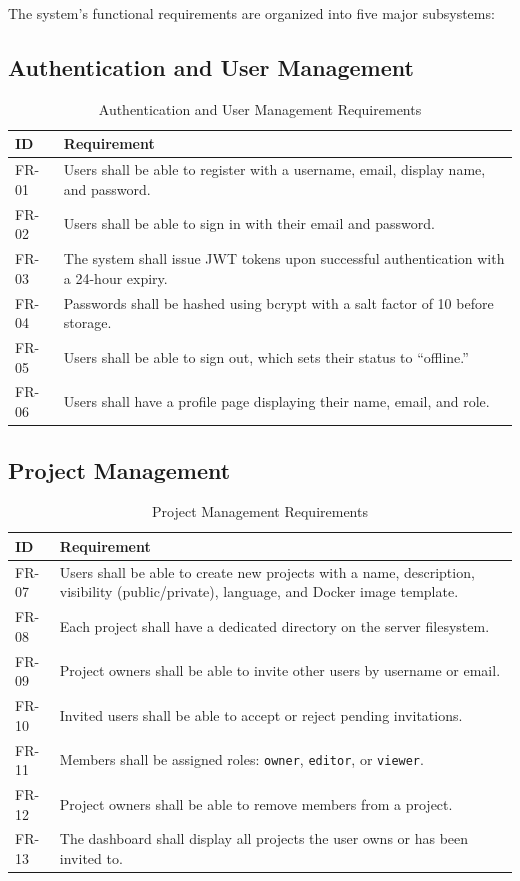 \documentclass[12pt,a4paper,oneside]{report}
\begin{document}
The system's functional requirements are organized into five major subsystems:

\subsection{Authentication and User Management}

\begin{table}[H]
\centering
\caption{Authentication and User Management Requirements}
\label{tab:auth-req}
\begin{tabularx}{\textwidth}{lX}
\toprule
\textbf{ID} & \textbf{Requirement} \\
\midrule
FR-01 & Users shall be able to register with a username, email, display name, and password. \\
FR-02 & Users shall be able to sign in with their email and password. \\
FR-03 & The system shall issue JWT tokens upon successful authentication with a 24-hour expiry. \\
FR-04 & Passwords shall be hashed using bcrypt with a salt factor of 10 before storage. \\
FR-05 & Users shall be able to sign out, which sets their status to ``offline.'' \\
FR-06 & Users shall have a profile page displaying their name, email, and role. \\
\bottomrule
\end{tabularx}
\end{table}

\subsection{Project Management}

\begin{table}[H]
\centering
\caption{Project Management Requirements}
\label{tab:project-req}
\begin{tabularx}{\textwidth}{lX}
\toprule
\textbf{ID} & \textbf{Requirement} \\
\midrule
FR-07 & Users shall be able to create new projects with a name, description, visibility (public/private), language, and Docker image template. \\
FR-08 & Each project shall have a dedicated directory on the server filesystem. \\
FR-09 & Project owners shall be able to invite other users by username or email. \\
FR-10 & Invited users shall be able to accept or reject pending invitations. \\
FR-11 & Members shall be assigned roles: \texttt{owner}, \texttt{editor}, or \texttt{viewer}. \\
FR-12 & Project owners shall be able to remove members from a project. \\
FR-13 & The dashboard shall display all projects the user owns or has been invited to. \\
\bottomrule
\end{tabularx}
\end{table}
\end{document}

